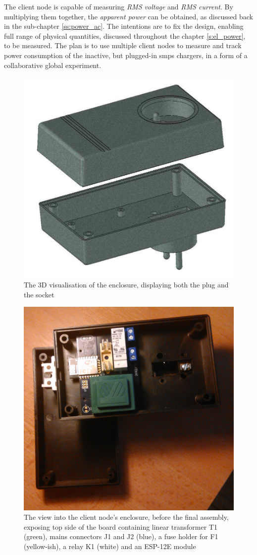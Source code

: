 \documentclass[journal]{IEEEtran}
\begin{document}
The client node is capable of measuring \textit{RMS voltage} and \textit{RMS current}. By multiplying them together, the \textit{apparent power} can be obtained, as discussed back in the sub-chapter \ref{ss:power_ac}. The intentions are to fix the design, enabling full range of physical quantities, discussed throughout the chapter \ref{s:el_power}, to be measured. The plan is to use multiple client nodes to measure and track power consumption of the inactive, but plugged-in \gls{smps} chargers, in a form of a collaborative global experiment.

\begin{figure}[]
\centering
\includegraphics[width=.8\linewidth,angle=0]{enclosure}
\caption{The 3D visualisation of the enclosure, displaying both the plug and the socket}\label{f:enclosure}
\end{figure}
\begin{figure}[]
\centering
\includegraphics[width=.8\linewidth,angle=0]{project_inside}
\caption{The view into the client node's enclosure, before the final assembly, exposing top side of the board containing linear transformer T1 (green), mains connectors J1 and J2 (blue), a fuse holder for F1 (yellow-ish), a relay K1 (white) and an ESP-12E module}\label{f:project_inside}
\end{figure}
\end{document}
